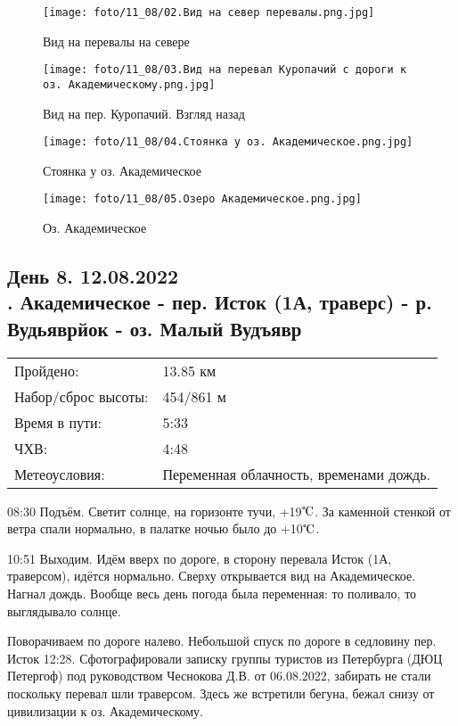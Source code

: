 \begin{figure}
    \centering
    \texttt{[image: foto/11\_08/02.Вид на север перевалы.png.jpg]}
    \caption{Вид на перевалы на севере}
\end{figure}

\begin{figure}
    \centering
    \texttt{[image: foto/11\_08/03.Вид на перевал Куропачий с дороги к оз. Академическому.png.jpg]}
    \caption{Вид на пер. Куропачий. Взгляд назад}
\end{figure}

\begin{figure}
    \centering
    \texttt{[image: foto/11\_08/04.Стоянка у оз. Академическое.png.jpg]}
    \caption{Стоянка у оз. Академическое}
\end{figure}

\begin{figure}[H]
    \centering
    \texttt{[image: foto/11\_08/05.Озеро Академическое.png.jpg]}
    \caption{Оз. Академическое}
\end{figure}

\subsection{День 8. 12.08.2022\\
. Академическое - пер. Исток (1А, траверс) - р. Вудьяврйок - оз. Малый Вудъявр}
\begin{tabular}{l p{12cm}}
\hline
Пройдено: & 13.85 км\\
Набор/сброс высоты: & 454/861 м\\
Время в пути: & 5:33\\
ЧХВ: & 4:48\\
Метеоусловия: & Переменная облачность, временами дождь.\\
\hline
\end{tabular}

08:30 Подъём. Светит солнце, на горизонте тучи, +19$\tccentigrade$.
За каменной стенкой от ветра спали нормально, в палатке ночью было до +10$\tccentigrade$.

10:51 Выходим. Идём вверх по дороге, в сторону перевала Исток (1А, траверсом), идётся нормально.
Сверху открывается вид на Академическое.
Нагнал дождь. Вообще весь день погода была переменная: то поливало, то выглядывало солнце.

Поворачиваем по дороге налево. Небольшой спуск по дороге в седловину пер. Исток 12:28.
Сфотографировали записку группы туристов из Петербурга (ДЮЦ Петергоф) под руководством Чеснокова Д.В. от 06.08.2022,
забирать не стали поскольку перевал шли траверсом. Здесь же встретили бегуна, бежал снизу от цивилизации к оз. Академическому.

